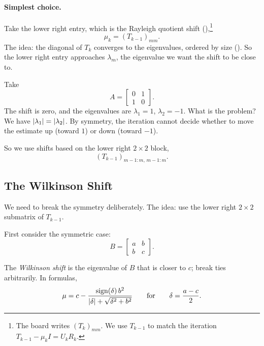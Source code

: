 \paragraph{Simplest choice.} Take the lower right entry, which is the Rayleigh quotient shift (),\footnote{The board writes $(T_k)_{mm}$. We use $T_{k-1}$ to match the iteration $T_{k-1} - \mu_kI = U_kR_k$.}
\begin{equation}
  \mu_k = (T_{k-1})_{mm}.
\end{equation}
The idea: the diagonal of $T_k$ converges to the eigenvalues, ordered by size (). So the lower right entry approaches $\lambda_m$, the eigenvalue we want the shift to be close to.

\begin{example}
  \label{ex:shift-symmetric-stuck}
  Take
  \begin{equation}
    A = \begin{bmatrix} 0 & 1 \\ 1 & 0 \end{bmatrix}.
  \end{equation}
  The shift is zero, and the eigenvalues are $\lambda_1 = 1$, $\lambda_2 = -1$. What is the problem? We have $\left\lvert \lambda_1 \right\rvert = \left\lvert \lambda_2 \right\rvert$. By symmetry, the iteration cannot decide whether to move the estimate up (toward $1$) or down (toward $-1$).
\end{example}

So we use shifts based on the lower right $2 \times 2$ block,
\begin{equation}
  (T_{k-1})_{m-1:m,\,m-1:m}.
\end{equation}

\subsection{The Wilkinson Shift}
\label{sec:wilkinson}

We need to break the symmetry deliberately. The idea: use the lower right $2 \times 2$ submatrix of $T_{k-1}$.

First consider the symmetric case:
\begin{equation}
  B = \begin{bmatrix} a & b \\ b & c \end{bmatrix}.
\end{equation}

\begin{definition}
  \label{def:wilkinson}
  The \emph{Wilkinson shift} is the eigenvalue of $B$ that is closer to $c$; break ties arbitrarily. In formulas,
  \begin{equation}
    \mu = c - \frac{\operatorname{sign}(\delta)\,b^2}{\left\lvert \delta \right\rvert + \sqrt{\delta^2 + b^2}}
    \qquad\text{for}\qquad
    \delta = \frac{a - c}{2}.
  \end{equation}
\end{definition}

